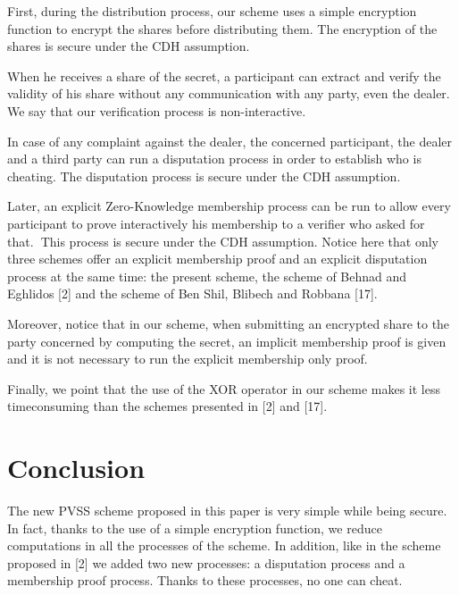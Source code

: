 \documentclass[submission,copyright,creativecommons]{eptcs}
\begin{document}
First, during the distribution process, our scheme uses a simple encryption
function to encrypt the shares before distributing them. The encryption of
the shares is secure under the CDH assumption.

When he receives a share of the secret, a participant can extract and verify
the validity of his share without any communication with any party, even the
dealer. We say that our verification process is non-interactive.

In case of any complaint against the dealer, the concerned participant, the
dealer and a third party  can run a disputation process in order to
establish who is cheating. The disputation process is secure under the CDH
assumption.

Later, an explicit Zero-Knowledge membership process can be run to allow
every participant to prove interactively his membership to a verifier who
asked for that.\textbf{\ }This process is secure under the CDH assumption. Notice here that only three schemes offer an explicit membership proof and an explicit disputation process at the same time: the present scheme, the
scheme of Behnad and Eghlidos [2] and the scheme of Ben Shil, Blibech and
Robbana [17].

Moreover, notice that in our scheme, when submitting an encrypted share to
the party concerned by computing the secret, an implicit membership proof is
given and it is not necessary to run the explicit membership only proof.

Finally, we point that the use of the XOR operator in our scheme makes it
less timeconsuming than the schemes presented in [2] and [17].

\section{Conclusion}

The new PVSS scheme proposed in this paper is very simple while being
secure. In fact, thanks to the use of a simple encryption function, we
reduce computations in all the processes of the scheme. In addition, like in
the scheme proposed in [2] we added two new processes: a disputation
process and a membership proof process. Thanks to these processes, no one
can cheat.


\nocite{*}


\end{document}
